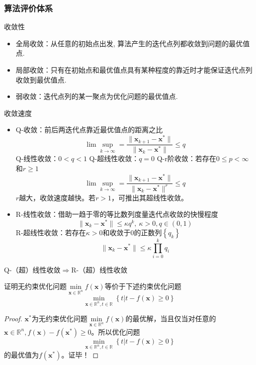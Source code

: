 \subsubsection{算法评价体系}
\begin{note}
    收敛性
    \begin{itemize}
        \item 全局收敛：从任意的初始点出发, 算法产生的迭代点列都收敛到问题的最优值点.
        \item 局部收敛：只有在初始点和最优值点具有某种程度的靠近时才能保证迭代点列收敛到最优值点.
        \item 弱收敛：迭代点列的某一聚点为优化问题的最优值点.
    \end{itemize}
\end{note}
\begin{note}
    收敛速度
    \begin{itemize}
        \item Q-收敛：前后两迭代点靠近最优值点的距离之比
        \[
            \lim\sup\limits_{k\to \infty}=\dfrac{\| \boldsymbol{x}_{k+1}-\boldsymbol{x}^{*} \|}{\|\boldsymbol{x}_{k}-\boldsymbol{x}^{*}\|}\leqslant q
        \]
        Q-线性收敛：$0<q<1$\newline
        Q-超线性收敛：$q = 0$\newline
        Q-r阶收敛：若存在$0\leqslant p<\infty$和$r\geqslant 1$
        \[
            \lim\sup\limits_{k\to \infty}=\dfrac{\| \boldsymbol{x}_{k+1}-\boldsymbol{x}^{*} \|}{\|\boldsymbol{x}_{k}-\boldsymbol{x}^{*}\|^r}\leqslant q
        \]
        $r$越大，收敛速度越快。若$r>1$，可推出其超线性收敛。
        \item R-线性收敛：借助一趋于零的等比数列度量迭代点收敛的快慢程度
        \[
            \| \boldsymbol{x}_{k}-\boldsymbol{x}^* \|\leqslant \kappa q^k,\ \kappa>0,q\in\left( 0,1 \right)
        \]
        R-超线性收敛：若存在$\kappa>0$和收敛于0的正数列$\left\{ q_k \right\}$
        \[
            \| \boldsymbol{x}_{k}-\boldsymbol{x}^* \|\leqslant \kappa\prod\limits_{i = 0}^{k}q_i
        \]
    \end{itemize}
    Q-（超）线性收敛$\Rightarrow$R-（超）线性收敛
\end{note}
\begin{example}
    证明无约束优化问题$\min\limits_{\boldsymbol{x}\in \mathbb{R}^n}f(\boldsymbol{x})$等价于下述约束优化问题
    \[
        \min\limits_{{\boldsymbol{x}\in \mathbb{R}^n},t\in \mathbb{R}}\left\{ t|t-f(\boldsymbol{x})\geqslant 0 \right\}
    \]
    \begin{proof}
        $\boldsymbol{x}^*$为无约束优化问题$\min\limits_{\boldsymbol{x}\in \mathbb{R}^n}f(\boldsymbol{x})$的最优解，当且仅当对任意的$\boldsymbol{x}\in\mathbb{R}^n,f(\boldsymbol{x})-f(\boldsymbol{x}^*)\geqslant 0$。所以优化问题
        \[
            \min\limits_{{\boldsymbol{x}\in \mathbb{R}^n},t\in \mathbb{R}}\left\{ t|t-f(\boldsymbol{x})\geqslant 0 \right\}
        \]
        的最优值为$f(\boldsymbol{x}^*)$。证毕！
    \end{proof}
\end{example}
